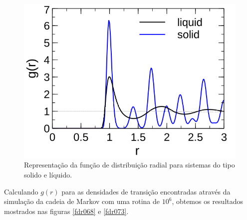 \documentclass[%
reprint,
amsmath,amssymb,
aps,
12pt
]{revtex4-1}
\begin{document}
\begin{figure}[!h]
	\centering
	\includegraphics[scale=0.4]{fdr.png}
	\caption{Representação da função de distribuição radial para sistemas do tipo solido e líquido.
	\label{fdr}}
\end{figure}

Calculando $ g(r) $ para as densidades de transição encontradas através da simulação da cadeia de Markov com uma rotina de $ 10^6 $, obtemos os resultados mostrados nas figuras \ref{fdr068} e \ref{fdr073}.
\end{document}
